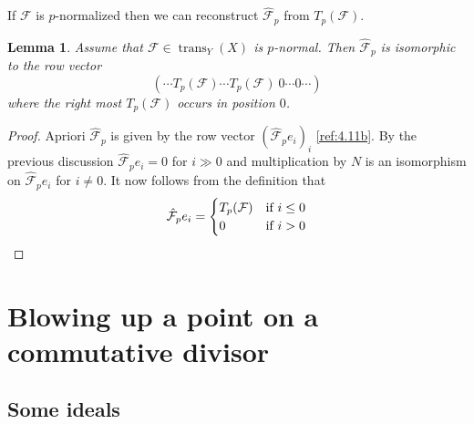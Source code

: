 \documentclass{amsproc}
\def\Fscr{{\mathcal F}}
\def\trans{\operatorname{trans}}
\let\oldtext\text
\def\text#1{\oldtext{\upshape #1}}
\newtheorem{lemmas}{Lemma}[subsection]
\theoremstyle{definition}
\theoremstyle{remark}
\numberwithin{equation}{section}
\numberwithin{table}{section}
\numberwithin{figure}{section}
\begin{document}
If $\Fscr$ is $p$-normalized then we can reconstruct $\hat{\Fscr}_p$ from
$T_p(\Fscr)$. 
\begin{lemmas} 
\label{ref:5.7.4a}
Assume that $\Fscr\in \trans_Y(X)$ is $p$-normal. Then
  $\hat{\Fscr}_p$ is isomorphic to the row vector 
\[
(\cdots T_p(\Fscr) \cdots T_p(\Fscr)\ 0 \cdots 0 \cdots)
\]
where the right most $T_p(\Fscr)$ occurs in position $0$.
\end{lemmas}
\begin{proof} Apriori $\hat{\Fscr}_p$ is given by the row vector
  $(\hat{\Fscr}_p e_i)_i$ \eqref{ref:4.11b}. By
  the previous discussion $\hat{\Fscr}_p e_i=0$ for $i\gg 0$ and
  multiplication by $N$ is an isomorphism on $\hat{\Fscr}_pe_i$ for
  $i\neq 0$. It now follows from the definition that
\[
\hat{\Fscr}_pe_i=
\begin{cases}
T_p(\Fscr)&\text{if $i\le 0$}\\
0&\text{if $i>0$}
\end{cases}
\qed\]
\def\qed{}\end{proof}









\section[Blowing up a point on a commutative divisor]{Blowing up a point on
a commutative divisor}
\label{ref:6a}
\subsection{Some ideals}
\label{ref:6.1a}
\leavevmode
\end{document}
